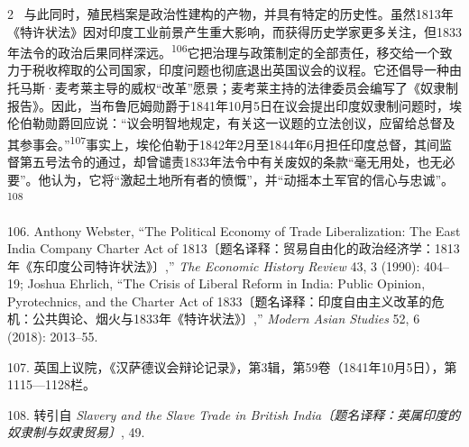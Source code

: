 \documentclass[10pt,a4paper]{article}
\begin{document}
\begin{paracol}{2}
\switchcolumn*
{\scriptsize\color{gray} [p. 21]}\ 与此同时，殖民档案是政治性建构的产物，并具有特定的历史性。虽然1813年《特许状法》因对印度工业前景产生重大影响，而获得历史学家更多关注，但1833年法令的政治后果同样深\mbox{远。\textsuperscript{106}}它把治理与政策制定的全部责任，移交给一个致力于税收榨取的公司国家，印度问题也彻底退出英国议会的议程。它还倡导一种由托马斯·麦考莱主导的威权“改革”愿景；麦考莱主持的法律委员会编写了《奴隶制报告》。因此，当布鲁厄姆勋爵于1841年10月5日在议会提出印度奴隶制问题时，埃伦伯勒勋爵回应说：“议会明智地规定，有关这一议题的立法创议，应留给总督及其参事会。”\nobreak\textsuperscript{107}事实上，埃伦伯勒于1842年2月至1844年6月担任印度总督，其间监督第五号法令的通过，却曾谴责1833年法令中有关废奴的条款“毫无用处，也无必要”。他认为，它将“激起土地所有者的愤慨”，并“动摇本土军官的信心与忠诚”。\nobreak\textsuperscript{108}\par{\small 106. Anthony Webster, “The Political Economy of Trade Liberalization: The East India Company Charter Act of 1813〔题名译释：贸易自由化的政治经济学：1813年《东印度公司特许状法》〕,” \textit{The Economic History Review} 43, 3 (1990): 404–19; Joshua Ehrlich, “The Crisis of Liberal Reform in India: Public Opinion, Pyrotechnics, and the Charter Act of 1833〔题名译释：印度自由主义改革的危机：公共舆论、烟火与1833年《特许状法》〕,” \textit{Modern Asian Studies} 52, 6 (2018): 2013–55.\par}{\small 107. 英国上议院，《汉萨德议会辩论记录》，第3辑，第59卷（1841年10月5日），第1115—1128栏。\par}{\small 108. 转引自 \textit{Slavery and the Slave Trade in British India〔题名译释：英属印度的奴隶制与奴隶贸易〕}, 49.\par}
\switchcolumn

\end{paracol}
\end{document}
